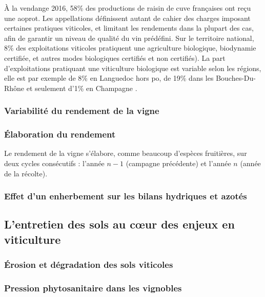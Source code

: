 \begin{Encadre}[!htb]
\begin{tcolorbox}
\begin{description}[leftmargin=0pt]
\item[Types de productions] À la vendange 2016, 58\% des productions de raisin de cuve françaises ont reçu une \gls{aoprot}. Les appellations définissent autant de cahier des charges imposant certaines pratiques viticoles, et limitant les rendements dans la plupart des cas, afin de garantir un niveau de qualité du vin prédéfini. Sur le territoire national, 8\% des exploitations viticoles pratiquent une agriculture biologique,  biodynamie certifiée, et autres modes biologiques certifiés et non certifiés). La part d'exploitations pratiquant une viticulture biologique est variable selon les régions, elle est par exemple de 8\% en Languedoc hors \gls{po}, de 19\% dans les Bouches-Du-Rhône et seulement d'1\% en  Champagne \citep{agreste_pratiques_2017}.
\end{description}
\end{tcolorbox}
\end{Encadre}



\subsubsection{Variabilité du rendement de la vigne}

\subsubsection{Élaboration du rendement}

Le rendement de la vigne s'élabore, comme beaucoup d'espèces fruitières, sur deux cycles consécutifs : l'année $n-1$ (campagne précédente) et l'année $n$ (année de la récolte). 


\subsubsection{Effet d'un enherbement sur les bilans hydriques et azotés}

\subsection{L'entretien des sols au cœur des enjeux en viticulture }
\subsubsection{Érosion et dégradation des sols viticoles}

\subsubsection{Pression phytosanitaire dans les vignobles}

